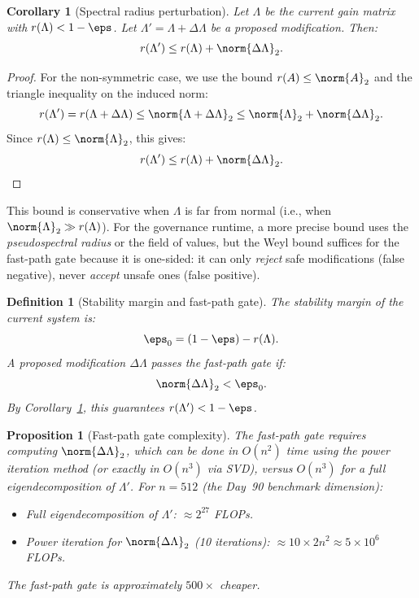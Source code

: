 \documentclass[11pt,letterpaper]{article}
\newtheorem{corollary}[theorem]{Corollary}
\newtheorem{definition}[theorem]{Definition}
\newtheorem{proposition}[theorem]{Proposition}
\theoremstyle{remark}
\begin{document}
\begin{corollary}[Spectral radius perturbation]
\label{cor:A-weyl-spectral}
Let $\Lambda$ be the current gain matrix with $r(\Lambda) < 1 - \eps$.
Let $\Lambda' = \Lambda + \Delta\Lambda$ be a proposed modification.
Then:
\[
  r(\Lambda') \leq r(\Lambda) + \norm{\Delta\Lambda}_2.
\]
\end{corollary}

\begin{proof}
For the non-symmetric case, we use the bound $r(A) \leq \norm{A}_2$
and the triangle inequality on the induced norm:
\[
  r(\Lambda') = r(\Lambda + \Delta\Lambda) \leq \norm{\Lambda + \Delta\Lambda}_2
  \leq \norm{\Lambda}_2 + \norm{\Delta\Lambda}_2.
\]
Since $r(\Lambda) \leq \norm{\Lambda}_2$, this gives:
\[
  r(\Lambda') \leq r(\Lambda) + \norm{\Delta\Lambda}_2.
\]
\end{proof}

\begin{remark}
This bound is conservative when $\Lambda$ is far from normal
(i.e., when $\norm{\Lambda}_2 \gg r(\Lambda)$). For the governance
runtime, a more precise bound uses the \emph{pseudospectral radius}
or the field of values, but the Weyl bound suffices for the fast-path
gate because it is one-sided: it can only \emph{reject} safe modifications
(false negative), never \emph{accept} unsafe ones (false positive).
\end{remark}

\begin{definition}[Stability margin and fast-path gate]
\label{def:stability-margin}
The \emph{stability margin} of the current system is:
\[
  \eps_0 = (1 - \eps) - r(\Lambda).
\]
A proposed modification $\Delta\Lambda$ \emph{passes the fast-path gate}
if:
\[
  \norm{\Delta\Lambda}_2 < \eps_0.
\]
By Corollary~\ref{cor:A-weyl-spectral}, this guarantees $r(\Lambda') < 1 - \eps$.
\end{definition}

\begin{proposition}[Fast-path gate complexity]
\label{prop:fast-path-complexity}
The fast-path gate requires computing $\norm{\Delta\Lambda}_2$,
which can be done in $O(n^2)$ time using the power iteration method
(or exactly in $O(n^3)$ via SVD), versus $O(n^3)$ for a full eigendecomposition
of $\Lambda'$. For $n = 512$ (the Day~90 benchmark dimension):
\begin{itemize}
  \item Full eigendecomposition of $\Lambda'$: $\approx 2^{27}$ FLOPs.
  \item Power iteration for $\norm{\Delta\Lambda}_2$ (10 iterations):
    $\approx 10 \times 2n^2 \approx 5 \times 10^6$ FLOPs.
\end{itemize}
The fast-path gate is approximately $500\times$ cheaper.
\end{proposition}
\end{document}
